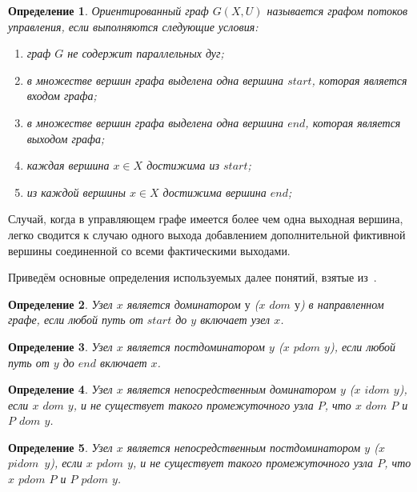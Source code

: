 \documentclass{jctart15a}
\begin{document}
\newtheorem{Def}{Определение}[section]
\begin{Def}
Ориентированный граф $G(X,U)$ называется графом потоков управления, если выполняются следующие условия:

	\begin{enumerate}
		\item[1)]
		граф $G$ не содержит параллельных дуг;
		\item[2)]
		в множестве вершин графа выделена одна вершина $start$, которая является входом графа;
		\item[3)]
		в множестве вершин графа выделена одна вершина $end$, которая является выходом графа;
		\item[4)]
		каждая вершина $x \in X$ достижима из $start$;
		\item[5)]
		из каждой вершины $x \in X$ достижима вершина $end$;
	\end{enumerate}

\end{Def}

Случай, когда в управляющем графе имеется более чем одна выходная вершина, легко сводится к случаю одного выхода добавлением дополнительной фиктивной вершины  соединенной со всеми фактическими выходами.

Приведём основные определения используемых далее понятий, взятые из~\cite{16}.

\newtheorem{DOM}{Определение}[section]
\begin{Def}
	Узел $x$ является доминатором $у$ ($x$ $dom$ $у$) в направленном графе, если любой путь от $start$ до $y$ включает узел $x$.
\end{Def}

\newtheorem{POSTDOM}{Определение}[section]
\begin{Def}
	Узел $x$ является постдоминатором $y$ ($x$ $pdom$ $y$), если любой путь от $y$ до $end$ включает $x$.
\end{Def}

\newtheorem{IDOM}{Определение}[section]
\begin{Def}
	Узел $x$ является непосредственным доминатором $y$ ($x$ $idom$ $y$), если $x$ $dom$ $y$, и не существует такого промежуточного узла $P$, что $x$ $dom$ $P$ и $P$ $dom$ $y$.
\end{Def}

\newtheorem{POSTIDOM}{Определение}[section]
\begin{Def}
	Узел $x$ является непосредственным постдоминатором $y$ ($x$~$pidom$~$y$), если $x$ $pdom$ $y$, и не существует такого промежуточного узла $P$, что $x$ $pdom$ $P$ и $P$ $pdom$ $y$.
\end{Def}
\end{document}
